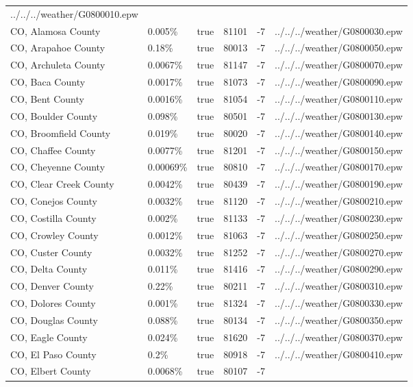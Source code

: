 \begin{longtable}[]{@{}llllll@{}}
../../../weather/G0800010.epw \\
CO, Alamosa County & 0.005\% & true & 81101 & -7 &
../../../weather/G0800030.epw \\
CO, Arapahoe County & 0.18\% & true & 80013 & -7 &
../../../weather/G0800050.epw \\
CO, Archuleta County & 0.0067\% & true & 81147 & -7 &
../../../weather/G0800070.epw \\
CO, Baca County & 0.0017\% & true & 81073 & -7 &
../../../weather/G0800090.epw \\
CO, Bent County & 0.0016\% & true & 81054 & -7 &
../../../weather/G0800110.epw \\
CO, Boulder County & 0.098\% & true & 80501 & -7 &
../../../weather/G0800130.epw \\
CO, Broomfield County & 0.019\% & true & 80020 & -7 &
../../../weather/G0800140.epw \\
CO, Chaffee County & 0.0077\% & true & 81201 & -7 &
../../../weather/G0800150.epw \\
CO, Cheyenne County & 0.00069\% & true & 80810 & -7 &
../../../weather/G0800170.epw \\
CO, Clear Creek County & 0.0042\% & true & 80439 & -7 &
../../../weather/G0800190.epw \\
CO, Conejos County & 0.0032\% & true & 81120 & -7 &
../../../weather/G0800210.epw \\
CO, Costilla County & 0.002\% & true & 81133 & -7 &
../../../weather/G0800230.epw \\
CO, Crowley County & 0.0012\% & true & 81063 & -7 &
../../../weather/G0800250.epw \\
CO, Custer County & 0.0032\% & true & 81252 & -7 &
../../../weather/G0800270.epw \\
CO, Delta County & 0.011\% & true & 81416 & -7 &
../../../weather/G0800290.epw \\
CO, Denver County & 0.22\% & true & 80211 & -7 &
../../../weather/G0800310.epw \\
CO, Dolores County & 0.001\% & true & 81324 & -7 &
../../../weather/G0800330.epw \\
CO, Douglas County & 0.088\% & true & 80134 & -7 &
../../../weather/G0800350.epw \\
CO, Eagle County & 0.024\% & true & 81620 & -7 &
../../../weather/G0800370.epw \\
CO, El Paso County & 0.2\% & true & 80918 & -7 &
../../../weather/G0800410.epw \\
CO, Elbert County & 0.0068\% & true & 80107 & -7 &

\end{longtable}
